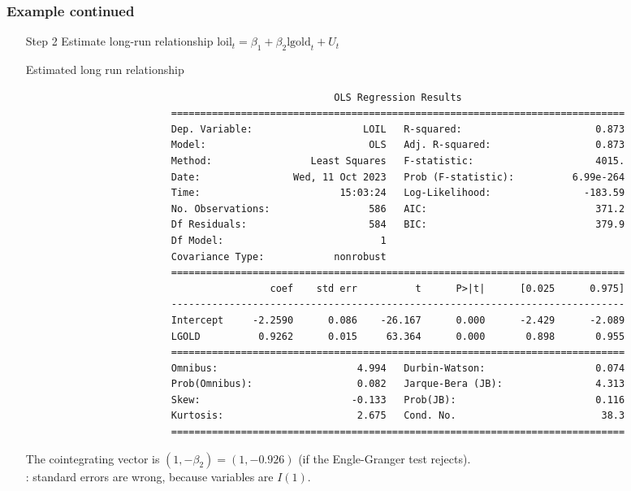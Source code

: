 \begin{frame}[fragile]\frametitle{Example continued}
\begin{itemize}
\item[Step 2] Estimate long-run relationship
$\textrm{loil}_t = \beta_1+\beta_2\textrm{lgold}_t+U_t$
\begin{block}{Estimated long run relationship}
\tiny
\begin{verbatim}
                                                     OLS Regression Results                            
                         ==============================================================================
                         Dep. Variable:                   LOIL   R-squared:                       0.873
                         Model:                            OLS   Adj. R-squared:                  0.873
                         Method:                 Least Squares   F-statistic:                     4015.
                         Date:                Wed, 11 Oct 2023   Prob (F-statistic):          6.99e-264
                         Time:                        15:03:24   Log-Likelihood:                -183.59
                         No. Observations:                 586   AIC:                             371.2
                         Df Residuals:                     584   BIC:                             379.9
                         Df Model:                           1                                         
                         Covariance Type:            nonrobust                                         
                         ==============================================================================
                                          coef    std err          t      P>|t|      [0.025      0.975]
                         ------------------------------------------------------------------------------
                         Intercept     -2.2590      0.086    -26.167      0.000      -2.429      -2.089
                         LGOLD          0.9262      0.015     63.364      0.000       0.898       0.955
                         ==============================================================================
                         Omnibus:                        4.994   Durbin-Watson:                   0.074
                         Prob(Omnibus):                  0.082   Jarque-Bera (JB):                4.313
                         Skew:                          -0.133   Prob(JB):                        0.116
                         Kurtosis:                       2.675   Cond. No.                         38.3
                         ==============================================================================
\end{verbatim}
\end{block}
The cointegrating vector is $(1, -\beta_2) = (1, -0.926)$ (if the Engle-Granger test rejects). \\
: standard errors are wrong, because variables are $I(1)$.
\end{itemize}
\end{frame}
